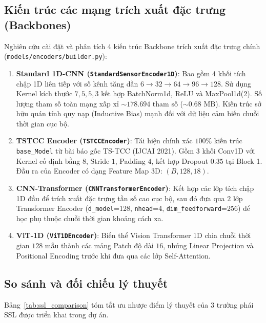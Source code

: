 \subsection{Kiến trúc các mạng trích xuất đặc trưng (Backbones)}
Nghiên cứu cài đặt và phân tích 4 kiến trúc Backbone trích xuất đặc trưng chính (\texttt{models/encoders/builder.py}):
\begin{enumerate}
    \item \textbf{Standard 1D-CNN (\texttt{StandardSensorEncoder1D})}: Bao gồm 4 khối tích chập 1D liên tiếp với số kênh tăng dần $6 \rightarrow 32 \rightarrow 64 \rightarrow 96 \rightarrow 128$. Sử dụng Kernel kích thước $7, 5, 5, 3$ kết hợp BatchNorm1d, ReLU và MaxPool1d(2). Số lượng tham số toàn mạng xấp xỉ $\sim 178.694$ tham số ($\sim 0.68\text{ MB}$). Kiến trúc sở hữu quán tính quy nạp (Inductive Bias) mạnh đối với dữ liệu cảm biến chuỗi thời gian cục bộ.
    \item \textbf{TSTCC Encoder (\texttt{TSTCCEncoder})}: Tái hiện chính xác $100\%$ kiến trúc \texttt{base\_Model} từ bài báo gốc TS-TCC (IJCAI 2021). Gồm 3 khối Conv1D với Kernel cố định bằng $8$, Stride $1$, Padding $4$, kết hợp Dropout $0.35$ tại Block 1. Đầu ra của Encoder có dạng Feature Map 3D: $(B, 128, 18)$.
    \item \textbf{CNN-Transformer (\texttt{CNNTransformerEncoder})}: Kết hợp các lớp tích chập 1D đầu để trích xuất đặc trưng tần số cao cục bộ, sau đó đưa qua $2$ lớp Transformer Encoder (\texttt{d\_model}=128, \texttt{nhead}=4, \texttt{dim\_feedforward}=256) để học phụ thuộc chuỗi thời gian khoảng cách xa.
    \item \textbf{ViT-1D (\texttt{ViT1DEncoder})}: Biến thể Vision Transformer 1D chia chuỗi thời gian $128$ mẫu thành các mảng Patch độ dài $16$, nhúng Linear Projection và Positional Encoding trước khi đưa qua các lớp Self-Attention.
\end{enumerate}

\subsection{So sánh và đối chiếu lý thuyết}
Bảng~\ref{tab:ssl_comparison} tóm tắt ưu nhược điểm lý thuyết của 3 trường phái SSL được triển khai trong dự án.

